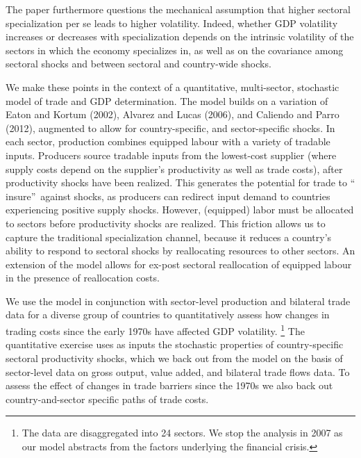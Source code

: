 \documentclass[12pt]{article}
\begin{document}
The paper furthermore questions the mechanical assumption that higher
sectoral specialization per se leads to higher volatility. Indeed, whether
GDP volatility increases or decreases with specialization depends on the
intrinsic volatility of the sectors in which the economy specializes in, as
well as on the covariance among sectoral shocks and between sectoral and
country-wide shocks.

We make these points in the context of a quantitative, multi-sector,
stochastic model of trade and GDP determination. The model builds on a
variation of Eaton and Kortum (2002), Alvarez and Lucas (2006), and Caliendo
and Parro (2012), augmented to allow for country-specific, and
sector-specific shocks. In each sector, production combines equipped labour
with a variety of tradable inputs. Producers source tradable inputs from the
lowest-cost supplier (where supply costs depend on the supplier's
productivity as well as trade costs), after productivity shocks have been
realized. This generates the potential for trade to \textquotedblleft
insure\textquotedblright\ against shocks, as producers can redirect input
demand to countries experiencing positive supply shocks. However, (equipped)
labor must be allocated to sectors before productivity shocks are realized.
This friction allows us to capture the traditional specialization channel,
because it reduces a country's ability to respond to sectoral shocks by
reallocating resources to other sectors. An extension of the model allows
for ex-post sectoral reallocation of equipped labour in the presence of
reallocation costs.

We use the model in conjunction with sector-level production and bilateral
trade data for a diverse group of countries to quantitatively assess how
changes in trading costs since the early 1970s have affected GDP volatility.%
\footnote{%
The data are disaggregated into 24 sectors. We stop the analysis in 2007 as
our model abstracts from the factors underlying the financial crisis.} The
quantitative exercise uses as inputs the stochastic properties of
country-specific sectoral productivity shocks, which we back out from the
model on the basis of sector-level data on gross output, value added, and
bilateral trade flows data. To assess the effect of changes in trade
barriers since the 1970s we also back out country-and-sector specific paths
of trade costs.
\end{document}
